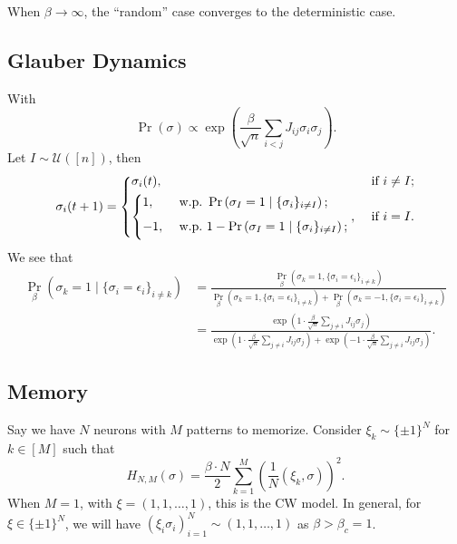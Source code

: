 \begin{note}
	When \(\beta \to \infty \), the ``random'' case converges to the deterministic case.
\end{note}

\subsection{Glauber Dynamics}
With
\[
	\Pr_{}\left(\sigma \right)
	\propto \exp (\frac{\beta }{\sqrt{n} } \sum_{i < j} J_{ij} \sigma _i \sigma _j).
\]
Let \(I \sim \mathcal{U} ([n])\), then
\[
	\sigma _i(t + 1)
	= \begin{dcases}
		\sigma _i (t),                                                                                & \text{ if } i \neq I ; \\
		\begin{dcases}
			1,  & \text{ w.p.\ } \Pr_{}\left(\sigma _I=1 \mid \{ \sigma _i \} _{i \neq I}\right)  ;    \\
			-1, & \text{ w.p.\ } 1 - \Pr_{}\left(\sigma _I=1 \mid \{ \sigma _i \} _{i \neq I}\right) ; \\
		\end{dcases}, & \text{ if } i = I.
	\end{dcases}
\]
We see that
\[
	\begin{split}
		\Pr_{\beta }\left(\sigma _k = 1 \mid \{ \sigma _i = \epsilon _i \}_{i \neq k} \right)
		 & = \frac{\Pr_{\beta }\left(\sigma _k = 1, \{ \sigma _i = \epsilon _i \}_{i \neq k}\right) }{\Pr_{\beta }\left(\sigma _k = 1, \{ \sigma _i = \epsilon _i \}_{i \neq k}\right) + \Pr_{\beta }\left(\sigma _k = -1, \{ \sigma _i = \epsilon _i \}_{i \neq k}\right) } \\
		 & = \frac{\exp (1 \cdot \frac{\beta }{\sqrt{n} } \sum_{j \neq i} J_{ij} \sigma _j)}{\exp (1 \cdot \frac{\beta }{\sqrt{n} } \sum_{j \neq i} J_{ij} \sigma _j) + \exp (-1 \cdot \frac{\beta }{\sqrt{n} } \sum_{j \neq i} J_{ij} \sigma _j)}.
	\end{split}
\]

\subsection{Memory}
Say we have \(N\) neurons with \(M\) patterns to memorize. Consider \(\xi _k \sim \{ \pm 1 \} ^N\) for \(k \in [M]\) such that
\[
	H_{N, M}(\sigma )
	= \frac{\beta \cdot N}{2} \sum_{k=1}^{M} \left( \frac{1}{N} (\xi _k, \sigma ) \right) ^2.
\]
When \(M = 1\), with \(\xi = (1, 1, \dots , 1)\), this is the CW model. In general, for \(\xi \in \{ \pm 1 \} ^N\), we will have \((\xi _i \sigma _i)_{i=1}^{N} \sim (1, 1, \dots , 1)\) as \(\beta > \beta _c = 1\).

